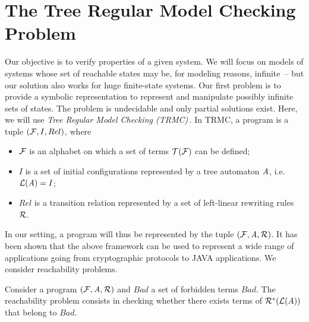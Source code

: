 
\section{The Tree Regular Model Checking Problem}
\label{sec:completion}

Our objective is to verify properties of a given system. We will focus
on models of systems whose set of reachable states may be, for
modeling reasons, infinite\,\cite{WB98} -- but our solution also works
for huge finite-state systems. Our first problem is to provide a
symbolic representation to represent and manipulate possibly infinite
sets of states. The problem is undecidable and only partial solutions
exist. Here, we will use {\em Tree Regular Model Checking
  (TRMC)}\,\cite{ALRd05}.
\noindent
In TRMC, a program is a tuple $(\mathcal{F}, I,
Rel)$, where

\begin{itemize}
\item
$\mathcal{F}$ is an alphabet on which a set of terms $\mathcal{T(F)}$ can be defined;

\item
$I$ is a set of initial configurations represented by a
tree automaton $\mathit A$, i.e. $\mathcal{L}(\mathit A)=I$;

\item $Rel$ is a transition relation represented by a set of
  left-linear rewriting rules $\mathcal R$.
\end{itemize}

\noindent
In our setting, a program will thus be represented by the tuple $(\mathcal{F},\mathit A,\mathcal R)$.
It has been shown that the above framework can be used to represent a
wide range of applications going from cryptographic protocols to JAVA
applications. We consider reachability problems.

\begin{definition}
\label{def:reachability}
Consider a program $(\mathcal{F},\mathit A,\mathcal R)$ and $Bad$ a set of forbidden terms
$Bad$. The reachability problem consists in checking whether there
exists terms of $\mathcal R^*(\mathcal{L}(\mathit A))$ that belong to $Bad$.
\end{definition}


